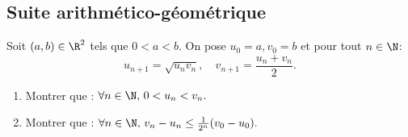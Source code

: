 

\subsection{Suite arithmético-géométrique}

\begin{exercice}
Soit $(a, b) \in \R^2$ tels que $0<a<b.$ On pose $u_0=a, v_0=b$ et pour tout $n\in \N$:
$$ u_{n+1} =\sqrt{u_n v_n}, \quad v_{n+1} = \frac{u_n +v_n}{2}.$$
\begin{enumerate}
\item Montrer que :  $\forall n\in \N, \, 0<u_n<v_n.$
\item Montrer que :  $\forall n\in \N, \, v_n-u_n\leq \frac{1}{2^n}(v_0-u_0).$
\end{enumerate}
\end{exercice}


